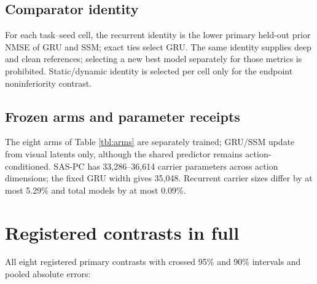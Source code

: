 \subsection{Comparator identity}\label{comparator-identity}

For each task--seed cell, the recurrent identity is the lower primary
held-out prior NMSE of GRU and SSM; exact ties select GRU. The same
identity supplies deep and clean references; selecting a new best model
separately for those metrics is prohibited. Static/dynamic identity is
selected per cell only for the endpoint noninferiority contrast.

\subsection{Frozen arms and parameter
receipts}\label{frozen-arms-and-parameter-receipts}

The eight arms of Table \ref{tbl:arms} are separately trained; GRU/SSM
update from visual latents only, although the shared predictor remains
action-conditioned. SAS-PC has 33,286--36,614 carrier parameters across
action dimensions; the fixed GRU width gives 35,048. Recurrent carrier
sizes differ by at most 5.29\% and total models by at most 0.09\%.

\section{Registered contrasts in
full}\label{registered-contrasts-in-full}

All eight registered primary contrasts with crossed 95\% and 90\%
intervals and pooled absolute errors:

